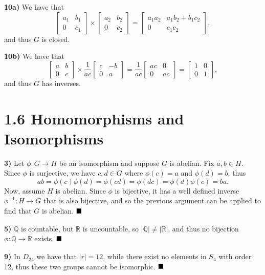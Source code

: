 \documentclass[12pt]{article}
\newcommand{\Q}{\mathbb{Q}}
\newcommand{\R}{\mathbb{R}}
\newcommand{\vertb}[1]{\left\vert#1\right\vert}
\newcommand{\done}{\ensuremath{\strut\hfill\blacksquare}}
\begin{document}
\textbf{10a)} We have that
\[
	\begin{bmatrix}
		a_1 & b_1 \\ 0 & c_1
	\end{bmatrix}
	\times
	\begin{bmatrix}
		a_2 & b_2 \\ 0 & c_2
	\end{bmatrix}
	= \begin{bmatrix}
		a_1a_2 & a_1b_2 + b_1c_2 \\
		0 & c_1c_2
	\end{bmatrix},
\]
and thus \( G \) is closed.

\textbf{10b)} We have that
\[
	\begin{bmatrix}
		a & b \\ 0 & c
	\end{bmatrix}
	\times
	\frac{1}{ac}
	\begin{bmatrix}
		c & -b \\ 0 & a
	\end{bmatrix}
	=
	\frac{1}{ac}
	\begin{bmatrix}
		ac & 0 \\ 0 & ac
	\end{bmatrix}
	=
	\begin{bmatrix}
		1 & 0 \\ 0 & 1
	\end{bmatrix},
\]
and thus \( G \) has inverses.

\section*{1.6 Homomorphisms and Isomorphisms}

\textbf{3)} Let \( \phi : G \to H \) be an isomorphism and suppose \( G \) is
abelian.
Fix \( a, b \in H \).
Since \( \phi \) is surjective, we have \( c, d \in G \) where
\( \phi(c) = a \) and \( \phi(d) = b \), thus
\[
	ab = \phi(c)\phi(d) = \phi(cd) = \phi(dc) = \phi(d)\phi(c) = ba.
\]
Now, assume \( H \) is abelian.
Since \( \phi \) is bijective, it has a well defined inverse
\( \phi^{-1} : H \to G \) that is also bijective, and so the previous argument
can be applied to find that \( G \) is abelian.
\done

\textbf{5)} \( \Q \) is countable, but \( \R \) is uncountable, so
\( \vertb{\Q} \ne \vertb{\R} \), and thus no bijection \( \phi: \Q \to \R \)
exists.
\done

\textbf{9)} In \( D_{24} \) we have that \( \vertb{r} = 12 \), while there
exist no elements in \( S_4 \) with order 12, thus these two groups cannot be
isomorphic.
\done
\end{document}
